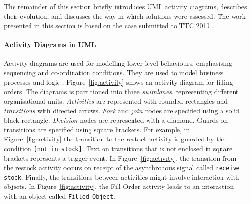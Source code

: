 The remainder of this section briefly introduces UML activity diagrams, describes their evolution, and discusses the way in which solutions were assessed. The work presented in this section is based on the case submitted to TTC 2010 \cite{rose10ttc_case}. 

\paragraph{Activity Diagrams in UML}
Activity diagrams are used for modelling lower-level behaviours, emphasising sequencing and co-ordination conditions. They are used to model business processes and logic \cite{uml22}. Figure~\ref{fig:activity} shows an activity diagram for filling orders. The diagrams is partitioned into three \emph{swimlanes}, representing different organisational units. \emph{Activities} are represented with rounded rectangles and \emph{transitions} with directed arrows. \emph{Fork} and \emph{join} nodes are specified using a solid black rectangle. \emph{Decision} nodes are represented with a diamond. Guards on transitions are specified using square brackets. For example, in Figure~\ref{fig:activity} the transition to the restock activity is guarded by the condition \texttt{[not in stock]}. Text on transitions that is not enclosed in square brackets represents a trigger event. In Figure~\ref{fig:activity}, the transition from the restock activity occurs on receipt of the asynchronous signal called \texttt{receive stock}. Finally, the transitions between activities might involve interaction with objects. In Figure~\ref{fig:activity}, the Fill Order activity leads to an interaction with an object called \texttt{Filled Object}. 

